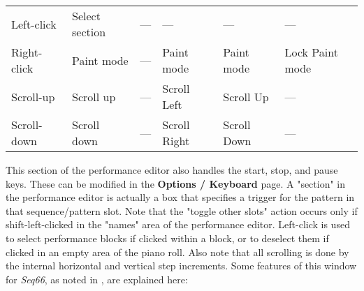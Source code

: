 \begin{table}[H]
\begin{tabular}{l l l l l l}
         Left-click        & Select section  & ---                & ---                & ---             & ---                \\
         Right-click       & Paint mode      & ---                & Paint mode         & Paint mode      & Lock Paint mode    \\
         Scroll-up         & Scroll up       & ---                & Scroll Left        & Scroll Up       & ---                \\
         Scroll-down       & Scroll down     & ---                & Scroll Right       & Scroll Down     & ---                \\
      \end{tabular}
   \end{table}

   This section of the performance editor also handles the start, stop, and
   pause keys.  These can be modified in the \textbf{Options / Keyboard} page.
   A "section" in the performance editor is actually a box that
   specifies a trigger for the pattern in that sequence/pattern slot.
   Note that the "toggle other slots" action occurs only if shift-left-clicked
   in the "names" area of the performance editor.
   Left-click is used to select performance blocks if clicked within
   a block, or to deselect them if clicked in an empty area of the piano roll.
   Also note that all scrolling is done by the internal horizontal and vertical
   step increments.
   Some features of this window for \textsl{Seq66},
   as noted in , are explained here:

